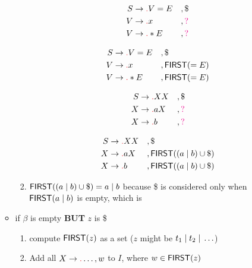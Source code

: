 \documentclass[10pt,a4paper,landscape]{article}
\begin{document}
\begin{multicols*}{3}
\begin{itemize}
\begin{itemize}[leftmargin=3em]
\begin{enumerate}
      \begin{minipage}{.3\linewidth}
        \begin{align*}
          S&\to \lrd V = E &&,\$ \\
          V&\to \lrd x     &&,\mr{?}  \\
          V&\to \lrd *E    &&,\mr{?}
        \end{align*}
      \end{minipage}
      \begin{minipage}{.7\linewidth}
        \begin{align*}
          S&\to \lrd V = E& &,\$ \\
          V&\to \lrd x    & &,\mfn{first}(=E)  \\
          V&\to \lrd *E   & &,\mfn{first}(=E)
        \end{align*}
      \end{minipage}
      \begin{minipage}{.2\linewidth}
        \begin{align*}
          S&\to \lrd XX &&,\$ \\
          X&\to \lrd aX &&,\mr{?}  \\
          X&\to \lrd b  &&,\mr{?}
        \end{align*}
      \end{minipage}
      \begin{minipage}{.8\linewidth}
        \begin{align*}
          S&\to \lrd XX    &&,\$ \\
          X&\to \lrd aX    &&,\mfn{first}((a\gor b)\cup\$)  \\
          X&\to \lrd b     &&,\mfn{first}((a\gor b)\cup\$)
        \end{align*}
      \end{minipage}
      \item $\mfn{first}((a\gor b)\cup\$) = a\gor b$ because \$ is considered only when $\mfn{first}(a\gor b)$ is empty, which is 
    \end{enumerate}
  \item if $\beta$ is empty \textbf{BUT} $z$ is  \$
    \begin{enumerate}
    \item compute $\mfn{first}(z)$ as a set ($z$ might be $t_1\;|\; t_2\;|\;\ldots$)
    \item Add all $X\to\lrd \ldots, w$ to $I$, where $w \in \mfn{first}(z)$


\end{enumerate}
\end{itemize}
\end{itemize}
\end{multicols*}
\end{document}
